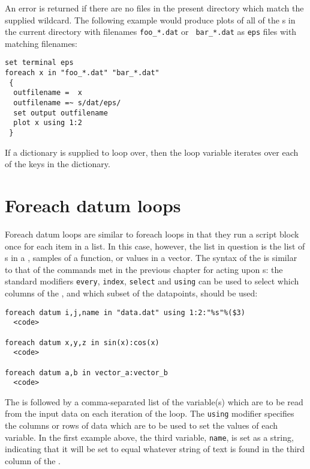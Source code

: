An error is returned if there are no files in the present directory which match
the supplied wildcard. The following example would produce plots of all of the
\datafile s in the current directory with filenames {\tt foo\_*.dat} or {\tt
bar\_*.dat} as {\tt eps} files with matching filenames:

\begin{verbatim}
set terminal eps
foreach x in "foo_*.dat" "bar_*.dat"
 {
  outfilename =  x
  outfilename =~ s/dat/eps/
  set output outfilename
  plot x using 1:2
 }
\end{verbatim}

If a dictionary is supplied to loop over, then the loop variable iterates over
each of the keys in the dictionary.

\section{Foreach datum loops}
\label{sec:foreach_datum}

Foreach datum loops are similar to foreach loops in that they run a script
block once for each item in a list.  In this case, however, the list in
question is the list of \datapoint s in a \datafile, samples of a function, or
values in a vector. The syntax of the  is similar to
that of the commands met in the previous chapter for acting upon \datafile s:
the standard modifiers {\tt every}, {\tt index}, {\tt select} and {\tt using}
can be used to select which columns of the \datafile, and which subset of the
datapoints, should be used:

\begin{verbatim}
foreach datum i,j,name in "data.dat" using 1:2:"%s"%($3)
  <code>

foreach datum x,y,z in sin(x):cos(x)
  <code>

foreach datum a,b in vector_a:vector_b
  <code>
\end{verbatim}

The  is followed by a comma-separated list of the
variable(s) which are to be read from the input data on each iteration of the
loop. The {\tt using} modifier specifies the columns or rows of data which are
to be used to set the values of each variable. In the first example above, the
third variable, {\tt name}, is set as a string, indicating that it will be set
to equal whatever string of text is found in the third column of the \datafile.

